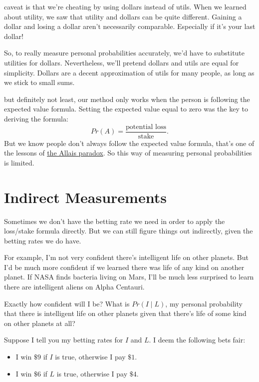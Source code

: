 \documentclass[justified]{tufte-book}
\providecommand{\tightlist}{%
  \setlength{\itemsep}{0pt}\setlength{\parskip}{0pt}}
\newcommand{\given}{\mid}
\newcommand{\p}{Pr}
\theoremstyle{definition}
\theoremstyle{definition}
\theoremstyle{definition}
\theoremstyle{definition}
\theoremstyle{remark}
\begin{document}
 caveat is that we're cheating by using dollars instead of utils. When we learned about utility, we saw that utility and dollars can be quite different. Gaining a dollar and losing a dollar aren't necessarily comparable. Especially if it's your last dollar!

So, to really measure personal probabilities accurately, we'd have to substitute utilities for dollars. Nevertheless, we'll pretend dollars and utils are equal for simplicity. Dollars are a decent approximation of utils for many people, as long as we stick to small sums.

 but definitely not least, our method only works when the person is following the expected value formula. Setting the expected value equal to zero was the key to deriving the formula:
\[ \p(A) = \frac{\mbox{potential loss}}{\mbox{stake}}. \]
But we know people don't always follow the expected value formula, that's one of the lessons of \protect\hyperlink{the-allais-paradox}{the Allais paradox}. So this way of measuring personal probabilities is limited.

\hypertarget{indirect-measurements}{%
\section{Indirect Measurements}\label{indirect-measurements}}

Sometimes we don't have the betting rate we need in order to apply the loss/stake formula directly. But we can still figure things out indirectly, given the betting rates we do have.

For example, I'm not very confident there's intelligent life on other planets. But I'd be much more confident if we learned there was life of any kind on another planet. If NASA finds bacteria living on Mars, I'll be much less surprised to learn there are intelligent aliens on Alpha Centauri.

Exactly how confident will I be? What is \(\p(I \given L)\), my personal probability that there is intelligent life on other planets given that there's life of some kind on other planets at all?

Suppose I tell you my betting rates for \(I\) and \(L\). I deem the following bets fair:

\begin{itemize}
\tightlist
\item
  I win \(\$9\) if \(I\) is true, otherwise I pay \(\$1\).
\item
  I win \(\$6\) if \(L\) is true, otherwise I pay \(\$4\).
\end{itemize}
\end{document}
